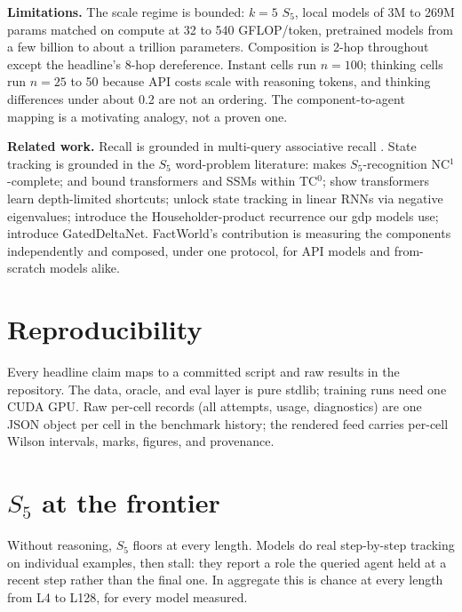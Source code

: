 \documentclass[11pt]{article}
\newcommand{\Sfive}{$S_5$}
\begin{document}
\textbf{Limitations.} The scale regime is bounded: $k=5$ \Sfive, local models of 3M to 269M
params matched on compute at 32 to 540 GFLOP/token, pretrained models from a few billion to
about a trillion parameters. Composition is 2-hop throughout except the headline's 8-hop
dereference. Instant cells run $n=100$; thinking cells run $n=25$ to 50 because API costs
scale with reasoning tokens, and thinking differences under about 0.2 are not an ordering. The
component-to-agent mapping is a motivating analogy, not a proven one.

\textbf{Related work.} Recall is grounded in multi-query associative recall
\citep{arora2023zoology}. State tracking is grounded in the \Sfive{} word-problem literature:
\citet{barrington1989} makes \Sfive-recognition NC$^1$-complete; \citet{merrill2023} and
\citet{merrill2024illusion} bound transformers and SSMs within TC$^0$; \citet{liu2023}
show transformers learn depth-limited shortcuts; \citet{grazzi2024} unlock state tracking in
linear RNNs via negative eigenvalues; \citet{siems2025deltaproduct} introduce the
Householder-product recurrence our gdp models use; \citet{yang2024gated} introduce
GatedDeltaNet. FactWorld's contribution is measuring the components independently and
composed, under one protocol, for API models and from-scratch models alike.

\section{Reproducibility}

Every headline claim maps to a committed script and raw results in the repository. The data,
oracle, and eval layer is pure stdlib; training runs need one CUDA GPU. Raw per-cell records
(all attempts, usage, diagnostics) are one JSON object per cell in the benchmark history; the
rendered feed carries per-cell Wilson intervals, marks, figures, and provenance.

\appendix

\section{\Sfive{} at the frontier}
\label{app:s5}

Without reasoning, \Sfive{} floors at every length. Models do real step-by-step tracking on
individual examples, then stall: they report a role the queried agent held at a recent step
rather than the final one. In aggregate this is chance at every length from L4 to L128, for
every model measured.
\end{document}
